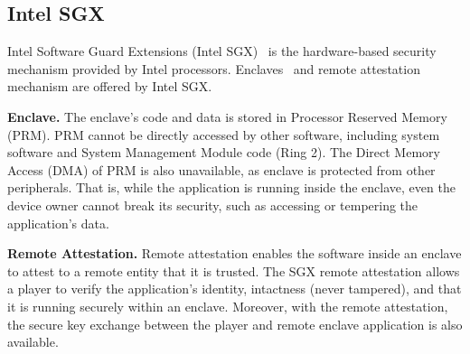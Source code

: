 \subsection{Intel SGX}
Intel Software Guard Extensions (Intel SGX)~\cite{costan2016intel} is the hardware-based security  mechanism provided by Intel processors.  Enclaves~\cite{costan2016intel} and remote attestation~\cite{costan2016intel} mechanism are offered by Intel SGX.
 
\vspace{1mm}\noindent\textbf{Enclave.}
The enclave’s code and data is stored in Processor Reserved Memory (PRM). 
PRM cannot be directly accessed by other software, including system software and System Management Module code (Ring 2).
The Direct Memory Access (DMA) of PRM is also unavailable, as enclave is protected from other peripherals. That is, while the application is running inside the enclave, even the device owner cannot break its security, such as accessing or tempering the application's data.



\vspace{1mm}\noindent\textbf{Remote Attestation.} 
Remote attestation enables the software inside an  enclave to attest to a remote entity that it is trusted. 
The SGX remote attestation allows a player to verify the application's identity, intactness (never tampered), and that it is running securely within an enclave.
Moreover, with the remote attestation, the secure key exchange between the player and remote enclave application is also available.%

 